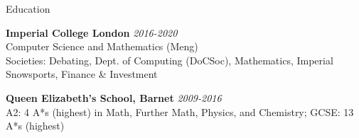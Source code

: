 \documentclass[10pt]{resume} %
\begin{document}

\begin{rSection}{Education}

{\bf Imperial College London} \hfill {\em 2016-2020} \\ 
Computer Science and Mathematics (Meng)\smallskip\\
Societies: Debating, Dept. of Computing (DoCSoc), Mathematics, Imperial Snowsports, Finance \& Investment

{\bf Queen Elizabeth's School, Barnet} \hfill {\em 2009-2016} \\ 
A2: 4 A*s (highest) in Math, Further Math, Physics, and Chemistry; GCSE: 13 A*s (highest)

\end{rSection}

\end{document}

